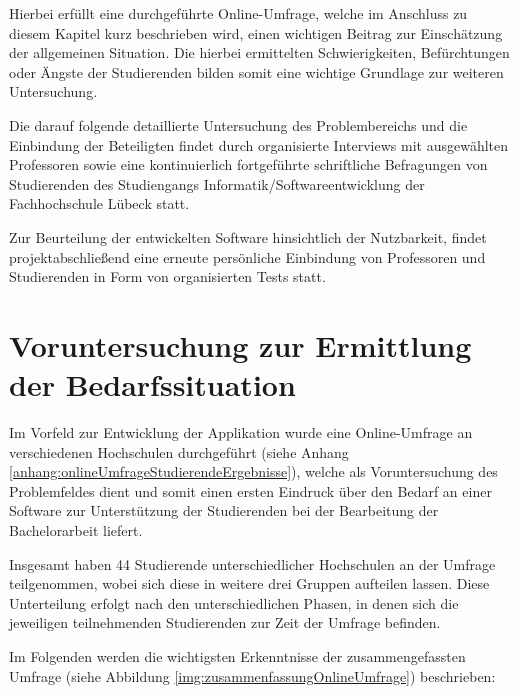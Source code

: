 \documentclass[bibliography=totoc,listof=totoc,BCOR=5mm,DIV=12,oneside]{scrbook}
\begin{document}
\par \bigskip Hierbei erfüllt eine durchgeführte Online-Umfrage, welche im Anschluss zu diesem Kapitel kurz beschrieben wird, einen wichtigen Beitrag zur Einschätzung der allgemeinen Situation. Die hierbei ermittelten Schwierigkeiten, Befürchtungen oder Ängste der Studierenden bilden somit eine wichtige Grundlage zur weiteren Untersuchung. 

\par \bigskip Die darauf folgende detaillierte Untersuchung des Problembereichs und die Einbindung der Beteiligten findet durch organisierte Interviews mit ausgewählten Professoren sowie eine kontinuierlich fortgeführte schriftliche Befragungen von Studierenden des Studiengangs Informatik/Softwareentwicklung der Fachhochschule Lübeck statt. 

\par \bigskip Zur Beurteilung der entwickelten Software hinsichtlich der Nutzbarkeit, findet projektabschließend eine erneute persönliche Einbindung von Professoren und Studierenden in Form von organisierten Tests statt.

\newpage
\section{Voruntersuchung zur Ermittlung der Bedarfssituation}
\par \bigskip Im Vorfeld zur Entwicklung der Applikation wurde eine Online-Umfrage an verschiedenen Hochschulen durchgeführt (siehe Anhang \ref{anhang:onlineUmfrageStudierendeErgebnisse}), welche als Voruntersuchung des Problemfeldes dient und somit einen ersten Eindruck über den Bedarf an einer Software zur Unterstützung der Studierenden bei der Bearbeitung der Bachelorarbeit liefert.

\par \bigskip Insgesamt haben 44 Studierende unterschiedlicher Hochschulen an der Umfrage teilgenommen, wobei sich diese in weitere drei Gruppen aufteilen lassen. Diese Unterteilung erfolgt nach den unterschiedlichen Phasen, in denen sich die jeweiligen teilnehmenden Studierenden zur Zeit der Umfrage befinden. 

\par \bigskip Im Folgenden werden die wichtigsten Erkenntnisse der zusammengefassten Umfrage (siehe Abbildung \ref{img:zusammenfassungOnlineUmfrage}) beschrieben:
\end{document}
